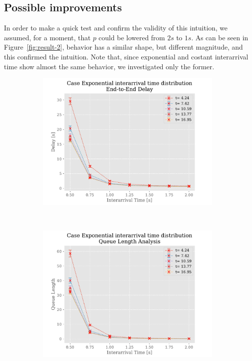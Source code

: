 \documentclass[a4paper,12pt]{article}
\begin{document}
\subsection{Possible improvements}
In order to make a quick test and confirm the validity of this intuition, we assumed, for a moment, that $p$ could be lowered from $2s$ to $1s$.
As can be seen in Figure~\ref{fig:result-2}, behavior has a similar shape, but different magnitude, and this confirmed the intuition.
Note that, since exponential and costant interarrival time show almost the same behavior, we investigated only the former.

\begin{figure}[H]
  \centering
  \begin{subfigure}[b]{.3\textwidth}
    \includegraphics[width=\textwidth]{img/DelayP1Exp.pdf}
  \end{subfigure}
  ~
  \begin{subfigure}[b]{.3\textwidth}
    \includegraphics[width=\textwidth]{img/QueueLengthP1Exp.pdf}

\end{subfigure}
\end{figure}
\end{document}
